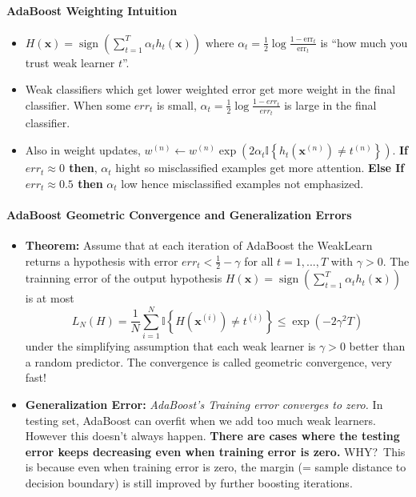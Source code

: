 \documentclass[10pt]{article}
\newcommand{\bx}{\mathbf{x}}
\begin{document}
\paragraph{AdaBoost Weighting Intuition}
\begin{itemize}
    \setlength\itemsep{-0.45em}
    \item $H(\mathbf{x})=\operatorname{sign}\left(\sum_{t=1}^{T} \alpha_{t} h_{t}(\mathbf{x})\right) \text { where } \alpha_{t}=\frac{1}{2} \log \frac{1-\mathrm{err}_{t}}{\mathrm{err}_{t}}$ is ``{how much you trust weak learner $t$}''. 
    \item Weak classifiers which get lower weighted error get more weight in the final classifier. When some $err_t$ is small, $\alpha_t = \frac{1}{2}\log \frac{1 - err_t}{err_t}$ is large in the final classifier.  
    \item Also in weight updates, $w^{(n)} \leftarrow w^{(n)} \exp \left(2 \alpha_{t} \mathbb{I}\left\{h_{t}\left(\mathbf{x}^{(n)}\right) \neq t^{(n)}\right\}\right)$. \textbf{If $err_t \approx 0$ then}, $\alpha_t$ hight so misclassified examples get more attention. \textbf{Else If $err_t \approx 0.5$ then} $\alpha_t$ low hence misclassified examples not emphasized. 
\end{itemize}

\paragraph{AdaBoost Geometric Convergence and Generalization Errors}
\begin{itemize}
    \setlength\itemsep{-0.45em}
    \item \textbf{Theorem:} Assume that at each iteration of AdaBoost the WeakLearn returns a hypothesis with error $err_t < \frac{1}{2} - \gamma$ for all $t = 1,...,T$ with $\gamma > 0$. The trainning error of the output hypothesis $H(\bx) = \operatorname{sign}\left(\sum_{t=1}^{T} \alpha_{t} h_{t}(\mathbf{x})\right)$ is at most $$L_{N}(H)=\frac{1}{N} \sum_{i=1}^{N} \mathbb{I}\left\{H\left(\mathbf{x}^{(i)}\right) \neq t^{(i)}\right\} \leq \exp \left(-2 \gamma^{2} T\right)$$ under the simplifying assumption that each weak learner is $\gamma>0$ better than a random predictor. The convergence is called geometric convergence, very fast!
    \item \textbf{Generalization Error:} \textit{AdaBoost's Training error converges to zero.} In testing set, AdaBoost can overfit when we add too much weak learners. However this doesn't always happen. \textbf{There are cases where the testing error keeps decreasing even when training error is zero.} \color{Red}WHY?\color{Black}~This is because even when training error is zero, the margin (= sample distance to decision boundary) is still improved by further boosting iterations. 
\end{itemize}
\end{document}
